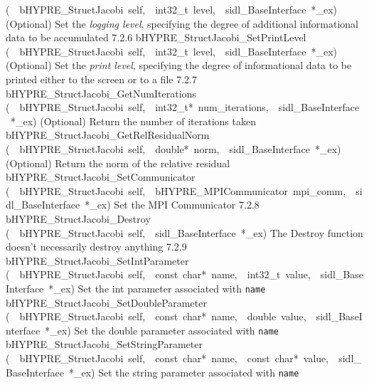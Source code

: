\documentclass{article}
\begin{document}
\begin{cxxentry}
\begin{cxxentry}
\begin{cxxnames}
        {(\ \ bHYPRE\_StructJacobi\ self,\ \ int32\_t\ level,\ \ sidl\_BaseInterface\ *\_ex)}
        {
(Optional) Set the {\it logging level}, specifying the degree
of additional informational data to be accumulated}
        {7.2.6}
        {bHYPRE\_StructJacobi\_SetPrintLevel}
        {(\ \ bHYPRE\_StructJacobi\ self,\ \ int32\_t\ level,\ \ sidl\_BaseInterface\ *\_ex)}
        {
(Optional) Set the {\it print level}, specifying the degree
of informational data to be printed either to the screen or
to a file}
        {7.2.7}
        {bHYPRE\_StructJacobi\_GetNumIterations}
        {(\ \ bHYPRE\_StructJacobi\ self,\ \ int32\_t*\ num\_iterations,\ \ sidl\_BaseInterface\ *\_ex)}
        {
(Optional) Return the number of iterations taken}
        {}
\label{cxx.7.2.15}
        {bHYPRE\_StructJacobi\_GetRelResidualNorm}
        {(\ \ bHYPRE\_StructJacobi\ self,\ \ double*\ norm,\ \ sidl\_BaseInterface\ *\_ex)}
        {
(Optional) Return the norm of the relative residual}
        {}
\label{cxx.7.2.16}
        {bHYPRE\_StructJacobi\_SetCommunicator}
        {(\ \ bHYPRE\_StructJacobi\ self,\ \ bHYPRE\_MPICommunicator\ mpi\_comm,\ \ sidl\_BaseInterface\ *\_ex)}
        {
Set the MPI Communicator}
        {7.2.8}
        {bHYPRE\_StructJacobi\_Destroy}
        {(\ \ bHYPRE\_StructJacobi\ self,\ \ sidl\_BaseInterface\ *\_ex)}
        {
The Destroy function doesn't necessarily destroy anything}
        {7.2.9}
        {bHYPRE\_StructJacobi\_SetIntParameter}
        {(\ \ bHYPRE\_StructJacobi\ self,\ \ const\ char*\ name,\ \ int32\_t\ value,\ \ sidl\_BaseInterface\ *\_ex)}
        {
Set the int parameter associated with {\tt name}}
        {}
\label{cxx.7.2.17}
        {bHYPRE\_StructJacobi\_SetDoubleParameter}
        {(\ \ bHYPRE\_StructJacobi\ self,\ \ const\ char*\ name,\ \ double\ value,\ \ sidl\_BaseInterface\ *\_ex)}
        {
Set the double parameter associated with {\tt name}}
        {}
\label{cxx.7.2.18}
        {bHYPRE\_StructJacobi\_SetStringParameter}
        {(\ \ bHYPRE\_StructJacobi\ self,\ \ const\ char*\ name,\ \ const\ char*\ value,\ \ sidl\_BaseInterface\ *\_ex)}
        {
Set the string parameter associated with {\tt name}}
        {}
\label{cxx.7.2.19}

\end{cxxnames}
\end{cxxentry}
\end{cxxentry}
\end{document}
